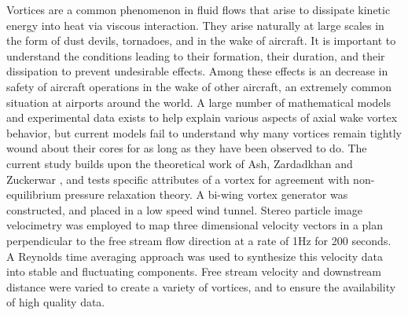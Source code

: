 
Vortices are a common phenomenon in fluid flows that arise to dissipate kinetic 
energy into heat via viscous interaction. They arise naturally at large scales 
in the form of dust devils, tornadoes, and in the wake of aircraft. It is 
important to understand the conditions leading to their formation, their 
duration, and their dissipation to prevent undesirable effects. Among these 
effects is an decrease in safety of aircraft operations in the wake of other 
aircraft, an extremely common situation at airports around the world. A large 
number of mathematical models and experimental data exists to help explain 
various aspects of axial wake vortex behavior, but current models fail to 
understand why many vortices remain tightly wound about their cores for as long 
as they have been observed to do. The current study builds upon the theoretical 
work of Ash, Zardadkhan and Zuckerwar \cite{ash2011}, and tests specific 
attributes of a vortex for agreement with non-equilibrium pressure relaxation 
theory. A bi-wing vortex generator was constructed, and placed in a low speed 
wind tunnel. Stereo particle image velocimetry was employed to map three 
dimensional velocity vectors in a plan perpendicular to the free stream flow 
direction at a rate of 1Hz for 200 seconds. A Reynolds time averaging approach 
was used to synthesize this velocity data into stable and fluctuating 
components. Free stream velocity and downstream distance were varied to create 
a variety of vortices, and to ensure the availability of high quality data.

